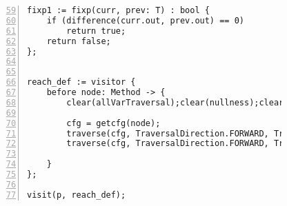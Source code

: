 \begin{figure}[ht!]
\begin{lstlisting}[numbers=left, tabsize=4, escapechar=@, caption={Nullness Analysis},label={lst:na-code}, firstline = 59, firstnumber=59]
fixp1 := fixp(curr, prev: T) : bool {
	if (difference(curr.out, prev.out) == 0)
		return true;	
	return false;
};


reach_def := visitor {
	before node: Method -> {
		clear(allVarTraversal);clear(nullness);clear(local);

		cfg = getcfg(node);
		traverse(cfg, TraversalDirection.FORWARD, TraversalKind.HYBRID, allVarTraversal);
		traverse(cfg, TraversalDirection.FORWARD, TraversalKind.HYBRID, nullness, fixp1);
			
	}
};

visit(p, reach_def);
\end{lstlisting}
\end{figure}